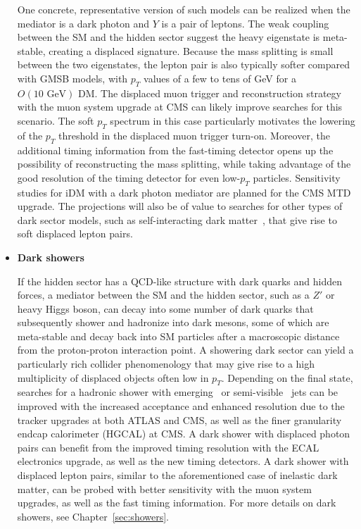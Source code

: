 \begin{itemize}
One concrete, representative version of such models can be realized when the mediator is a dark photon and $Y$ is a pair of leptons. The weak coupling between the SM and the hidden sector suggest the heavy eigenstate is meta-stable, creating a displaced signature. Because the mass splitting is small between the two eigenstates, the lepton pair is also typically softer compared with GMSB models, with $p_T$ values of a few to tens of GeV for a $O(10\,\,\mathrm{GeV})$ DM. The displaced muon trigger and reconstruction strategy with the muon system upgrade at CMS can likely improve searches for this scenario. The soft $p_T$ spectrum in this case particularly motivates the lowering of the $p_T$ threshold in the displaced muon trigger turn-on. Moreover, the additional timing information from the fast-timing detector opens up the possibility of reconstructing the mass splitting, while taking advantage of the good resolution of the timing detector for even low-$p_T$ particles. Sensitivity studies for iDM with a dark photon mediator are planned for the CMS MTD upgrade. The projections will also be of value to searches for other types of dark sector models, such as self-interacting dark matter~\cite{Hochberg:2014dra}, that give rise to soft displaced lepton pairs. %

\item \textbf{Dark showers}

If the hidden sector has a QCD-like structure with dark quarks and hidden forces, a mediator between the SM and the hidden sector, such as a $Z'$ or heavy Higgs boson, can decay into some number of dark quarks that subsequently shower and hadronize into dark mesons, some of which are meta-stable and decay back into SM particles after a macroscopic distance from the proton-proton interaction point. A showering dark sector can yield a particularly rich collider phenomenology that may give rise to a high multiplicity of displaced objects often low in $p_T$. Depending on the final state, searches for a hadronic shower with emerging~\cite{Schwaller:2015gea} or semi-visible~\cite{Cohen:2015toa} jets can be improved with the increased acceptance and enhanced resolution due to the tracker upgrades at both ATLAS and CMS, as well as the finer granularity endcap calorimeter (HGCAL) at CMS. A dark shower with displaced photon pairs can benefit from the improved timing resolution with the ECAL electronics upgrade, as well as the new timing detectors. A dark shower with displaced lepton pairs, similar to the aforementioned case of inelastic dark matter, can be probed with better sensitivity with the muon system upgrades, as well as the fast timing information. For more details on dark showers, see Chapter~\ref{sec:showers}.


\end{itemize}
